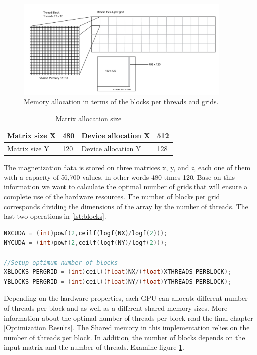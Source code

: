 \begin{figure}[htbp]
	\centering
		\includegraphics[width=0.93\textwidth]{Figures/block.png}
		\smallskip
	\caption[Grid layout]{Memory allocation in terms of the blocks per threads and grids.}
	\label{fig:block}
\end{figure}


\begin{table}[h]
\centering
\begin{tabular}{| l | l | l | l | }
\hline
Matrix size X & 480 & Device allocation X & 512\\
\hline
Matrix size Y & 120 & Device allocation Y & 128 \\
\hline
\end{tabular}
\caption{Matrix allocation size}
\label{tab:cuda}
\end{table}

The magnetization data is stored on three matrices x, y, and z, each one of them with a capacity of 56,700 values, in other words 480 times 120. Base on this information we want to calculate the optimal number of grids that will ensure a complete use of the hardware resources. The number of blocks per grid corresponds dividing the dimensions of the array by the number of threads. The last two operations in \ref{lst:blocks}.

\begin{lstlisting}[language=C++, label={lst:blocks}, caption={Device capacity calculation and number of block per grid}]	
NXCUDA = (int)powf(2,ceilf(logf(NX)/logf(2)));
NYCUDA = (int)powf(2,ceilf(logf(NY)/logf(2)));

//Setup optimum number of blocks
XBLOCKS_PERGRID = (int)ceil((float)NX/(float)XTHREADS_PERBLOCK); 
YBLOCKS_PERGRID = (int)ceil((float)NY/(float)YTHREADS_PERBLOCK);
\end{lstlisting}

Depending on the hardware properties, each GPU can allocate different number of threads per block and as well as a different shared memory sizes. More information about the optimal number of threads per block read the final chapter \ref{Optimization Results}. The Shared memory in this implementation relies on the number of threads per block. In addition, the number of blocks depends on the input matrix and the number of threads. Examine figure \ref{fig:block}.

